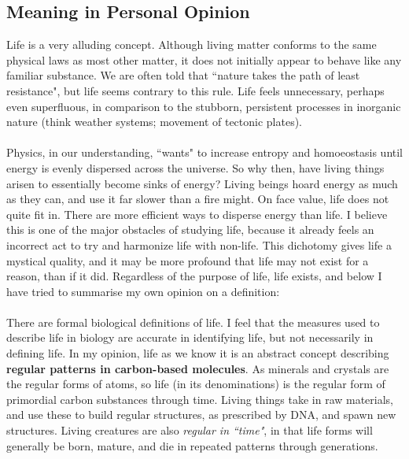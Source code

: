 \documentclass[10pt,a4paper]{article}
\begin{document}
			\subsection{Meaning in Personal Opinion}

				Life is a very alluding concept. Although living matter conforms to the
				same physical laws as most other matter, it does not initially appear to
				behave like any familiar substance. We are often told that ``nature
				takes the path of least resistance", but life seems contrary to this
				rule. Life feels unnecessary, perhaps even superfluous, in comparison to
				the stubborn, persistent processes in inorganic nature (think weather
				systems; movement of tectonic plates). \\\\ Physics, in our
				understanding, ``wants" to increase entropy and homoeostasis until
				energy is evenly dispersed across the universe. So why then, have living
				things arisen to essentially become sinks of energy? Living beings hoard
				energy as much as they can, and use it far slower than a fire might. On
				face value, life does not quite fit in. There are more efficient ways to
				disperse energy than life. I believe this is one of the major obstacles
				of studying life, because it already feels an incorrect act to try and
				harmonize life with non-life. This dichotomy gives life a mystical
				quality, and it may be more profound that life may not exist for a
				reason, than if it did. Regardless of the purpose of life, life exists,
				and below I have tried to summarise my own opinion on a definition: \\\\
				There are formal biological definitions of life. I feel that the
				measures used to describe life in biology are accurate in identifying
				life, but not necessarily in defining life.  In my opinion, life as we
				know it is an abstract concept describing \textbf{regular patterns in
				carbon-based molecules}. As minerals and crystals are the regular forms
				of atoms, so life (in its denominations) is the regular form of
				primordial carbon substances through time. Living things take in raw
				materials, and use these to build regular structures, as prescribed by
				DNA, and spawn new structures. Living creatures are also \textsl{regular
				in ``time"}, in that life forms will generally be born, mature, and die
				in repeated patterns through generations.
\end{document}
